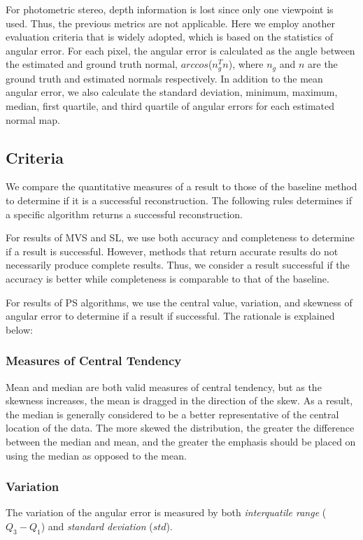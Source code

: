 For photometric stereo, depth information is lost since only one viewpoint is used. Thus, the previous metrics are not applicable. Here we employ another evaluation criteria that is widely adopted, which is based on the statistics of angular error. For each pixel, the angular error is calculated as the angle between the estimated and ground truth normal, \ie $arccos$($n_g^T n$), where $n_g$ and $n$ are the ground truth and estimated normals respectively. In addition to the mean angular error, we also calculate the standard deviation, minimum, maximum, median, first quartile, and third quartile of angular errors for each estimated normal map.

\subsection{Criteria}
We compare the quantitative measures of a result to those of the baseline method to determine if it is a successful reconstruction. The following rules determines if a specific algorithm returns a successful reconstruction.

For results of MVS and SL, we use both accuracy and completeness to determine if a result is successful. However, methods that return accurate results do not necessarily produce complete results. Thus, we consider a result successful if the accuracy is better while completeness is comparable to that of the baseline.

For results of PS algorithms, we use the central value, variation, and skewness of angular error to determine if a result if successful. The rationale is explained below:

\subsubsection{Measures of Central Tendency}
Mean and median are both valid measures of central tendency, but as the skewness increases, the mean is dragged in the direction of the skew. As a result, the median is generally considered to be a better representative of the central location of the data. The more skewed the distribution, the greater the difference between the median and mean, and the greater the emphasis should be placed on using the median as opposed to the mean.

\subsubsection{Variation}
The variation of the angular error is measured by both \textit{interquatile range} ($Q_3 - Q_1$) and \textit{standard deviation} ($std$).
  
